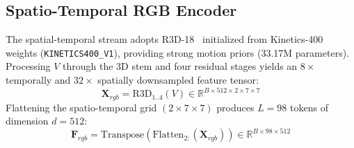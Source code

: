 \documentclass[conference,10pt]{IEEEtran}
\begin{document}
\subsection{Spatio-Temporal RGB Encoder}
The spatial-temporal stream adopts R3D-18~\cite{tran2018closer} initialized from Kinetics-400 weights (\texttt{KINETICS400\_V1}), providing strong motion priors (33.17M parameters). Processing $V$ through the 3D stem and four residual stages yields an $8\times$ temporally and $32\times$ spatially downsampled feature tensor:
\begin{equation}
    \mathbf{X}_{rgb} = \text{R3D}_{1..4}(V) \in \mathbb{R}^{B \times 512 \times 2 \times 7 \times 7}
\end{equation}
Flattening the spatio-temporal grid $(2 \times 7 \times 7)$ produces $L=98$ tokens of dimension $d=512$:
\begin{equation}
    \mathbf{F}_{rgb} = \text{Transpose}(\text{Flatten}_{2:}(\mathbf{X}_{rgb})) \in \mathbb{R}^{B \times 98 \times 512}
\end{equation}
\end{document}
